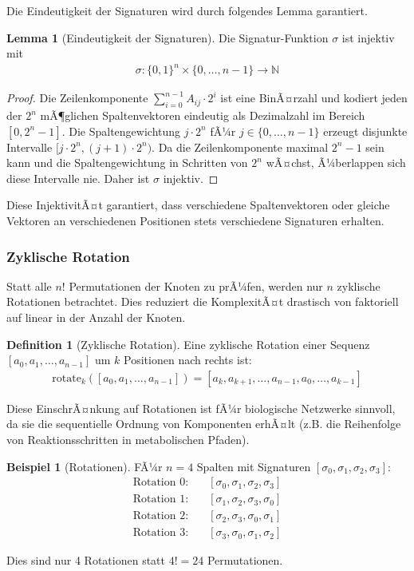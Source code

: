 ﻿\documentclass[a4paper,12pt]{article}
\theoremstyle{definition}
\newtheorem{definition}{Definition}
\newtheorem{beispiel}{Beispiel}
\newtheorem{lemma}{Lemma}
\begin{document}
Die Eindeutigkeit der Signaturen wird durch folgendes Lemma garantiert.
\begin{lemma}[Eindeutigkeit der Signaturen]
	Die Signatur-Funktion $\sigma$ ist injektiv mit
	\begin{align}
		\sigma: \{0,1\}^n \times \{0,\ldots,n-1\} \to \mathbb{N}
	\end{align}
\end{lemma}

\begin{proof}
	Die Zeilenkomponente $\sum_{i=0}^{n-1} A_{ij} \cdot 2^i$ ist eine BinÃ¤rzahl und kodiert jeden der $2^n$ mÃ¶glichen Spaltenvektoren eindeutig als Dezimalzahl im Bereich $[0, 2^n-1]$. Die Spaltengewichtung $j \cdot 2^n$ fÃ¼r $j \in \{0,\ldots,n-1\}$ erzeugt disjunkte Intervalle $[j \cdot 2^n, (j+1) \cdot 2^n)$. Da die Zeilenkomponente maximal $2^n - 1$ sein kann und die Spaltengewichtung in Schritten von $2^n$ wÃ¤chst, Ã¼berlappen sich diese Intervalle nie. Daher ist $\sigma$ injektiv.
\end{proof}

Diese InjektivitÃ¤t garantiert, dass verschiedene Spaltenvektoren oder gleiche Vektoren an verschiedenen Positionen stets verschiedene Signaturen erhalten.

\subsubsection{Zyklische Rotation}

Statt alle $n!$ Permutationen der Knoten zu prÃ¼fen, werden nur $n$ zyklische Rotationen betrachtet. Dies reduziert die KomplexitÃ¤t drastisch von faktoriell auf linear in der Anzahl der Knoten.

\begin{definition}[Zyklische Rotation]
	Eine zyklische Rotation einer Sequenz $[a_0, a_1, \ldots, a_{n-1}]$ um $k$ Positionen nach rechts ist:
	\begin{align}
		\text{rotate}_k([a_0, a_1, \ldots, a_{n-1}]) = [a_k, a_{k+1}, \ldots, a_{n-1}, a_0, \ldots, a_{k-1}]
	\end{align}
\end{definition}

Diese EinschrÃ¤nkung auf Rotationen ist fÃ¼r biologische Netzwerke sinnvoll, da sie die sequentielle Ordnung von Komponenten erhÃ¤lt (z.B. die Reihenfolge von Reaktionsschritten in metabolischen Pfaden).

\begin{beispiel}[Rotationen]
	FÃ¼r $n=4$ Spalten mit Signaturen $[\sigma_0, \sigma_1, \sigma_2, \sigma_3]$:
	\begin{align*}
		\text{Rotation 0:} & \quad [\sigma_0, \sigma_1, \sigma_2, \sigma_3] \\
		\text{Rotation 1:} & \quad [\sigma_1, \sigma_2, \sigma_3, \sigma_0] \\
		\text{Rotation 2:} & \quad [\sigma_2, \sigma_3, \sigma_0, \sigma_1] \\
		\text{Rotation 3:} & \quad [\sigma_3, \sigma_0, \sigma_1, \sigma_2]
	\end{align*}
	
	Dies sind nur 4 Rotationen statt $4! = 24$ Permutationen.
\end{beispiel}
\end{document}
